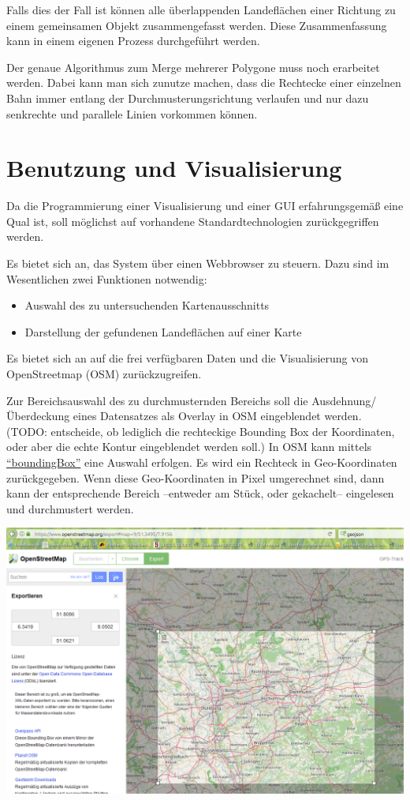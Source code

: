 \documentclass[
11pt, %
a4paper, %
oneside, %
pdfspacing, %
headinclude,
BCOR5mm, %
ngerman, %
bibtotocnumbered,
]{scrartcl}
\begin{document}
Falls dies der Fall ist können alle überlappenden Landeflächen einer Richtung zu einem gemeinsamen Objekt zusammengefasst werden. Diese Zusammenfassung kann in einem eigenen Prozess durchgeführt werden. 

Der genaue Algorithmus zum Merge mehrerer Polygone muss noch erarbeitet werden. Dabei kann man sich zunutze machen, dass die Rechtecke einer einzelnen Bahn immer entlang der Durchmusterungsrichtung verlaufen und nur dazu senkrechte und parallele Linien vorkommen können. 

\section{Benutzung und Visualisierung}

Da die Programmierung einer Visualisierung und einer GUI erfahrungsgemäß eine Qual ist, soll möglichst auf vorhandene Standardtechnologien zurückgegriffen werden.

Es bietet sich an, das System über einen Webbrowser zu steuern. Dazu sind im Wesentlichen zwei Funktionen notwendig:
\begin{itemize}
	\item Auswahl des zu untersuchenden Kartenausschnitts
	\item Darstellung der gefundenen Landeflächen auf einer Karte
\end{itemize}

Es bietet sich an auf die frei verfügbaren Daten und die Visualisierung von OpenStreetmap (OSM) zurückzugreifen. 

Zur Bereichsauswahl des zu durchmusternden Bereichs soll die Ausdehnung/Überdeckung eines Datensatzes als Overlay in OSM eingeblendet werden. (TODO: entscheide, ob lediglich die rechteckige Bounding Box der Koordinaten, oder aber die echte Kontur eingeblendet werden soll.)
In OSM kann mittels \href{http://wiki.openstreetmap.org/wiki/Bounding_Box}{"`boundingBox"'} eine Auswahl erfolgen. Es wird ein Rechteck in Geo-Koordinaten zurückgegeben. Wenn diese Geo-Koordinaten in Pixel umgerechnet sind, dann kann der entsprechende Bereich –entweder am Stück, oder gekachelt– eingelesen und durchmustert werden. 

\includegraphics[width=\textwidth]{./drawings/AuswahlKartenausschnitt.png}
\end{document}
